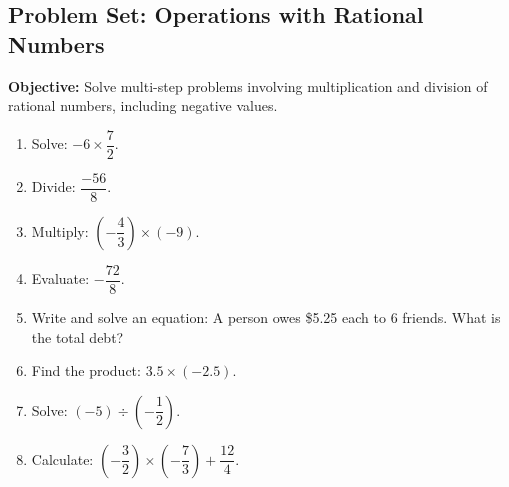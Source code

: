 \documentclass[12pt]{article}
\title{}
\date{}
\begin{document}
\subsection*{Problem Set: Operations with Rational Numbers}
\onehalfspacing

\begin{tcolorbox}[colframe=black!40, colback=gray!5, 
coltitle=black, colbacktitle=black!20, fonttitle=\bfseries\Large, 
title=Learning Objective, halign title=center, left=5pt, right=5pt, top=5pt, bottom=15pt]
\textbf{Objective:} Solve multi-step problems involving multiplication and division of rational numbers, including negative values.
\end{tcolorbox}

\begin{tcolorbox}[colframe=black!60, colback=white, 
coltitle=black, colbacktitle=black!15, fonttitle=\bfseries\Large, 
title=Exercises, halign title=center, left=10pt, right=10pt, top=10pt, bottom=60pt]
\begin{enumerate}[itemsep=3em]
    \item Solve: \( -6 \times \dfrac{7}{2} \).
    \item Divide: \( \dfrac{-56}{8} \).
    \item Multiply: \( (-\dfrac{4}{3}) \times (-9) \).
    \item Evaluate: \( -\dfrac{72}{8} \).
    \item Write and solve an equation: A person owes \$5.25 each to 6 friends. What is the total debt?
    \item Find the product: \( 3.5 \times (-2.5) \).
    \item Solve: \( (-5) \div (-\dfrac{1}{2}) \).
    \item Calculate: \( (-\dfrac{3}{2}) \times (-\dfrac{7}{3}) + \dfrac{12}{4} \).
\end{enumerate}
\end{tcolorbox}

\vspace{1em}
\end{document}
